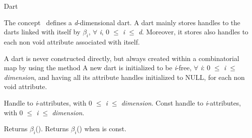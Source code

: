 \ccRefPageBegin
\begin{ccRefConcept}{Dart}

\ccDefinition
  
The concept \ccRefName\ defines a \emph{d}-dimensional dart.  A dart mainly
stores handles to the darts linked with itself by $\beta_i$, $\forall$
\emph{i}, 0 $\leq$ \emph{i} $\leq$ \emph{d}. Moreover, it stores also handles to each
non void attribute associated with itself.


\ccCreation 
{} 
A dart  is never constructed directly, but always created
within a combinatorial map  by using the method
 A new dart is initialized to be \emph{i}-free,
$\forall$ \emph{i}: 0 $\leq$ \emph{i} $\leq$ \emph{dimension}, and having all its attribute
handles initialized to NULL, for each non void attribute.

\ccConstants
{}

\ccTypes
{}
%
\ccGlue
{}

    {Handle to \emph{i}-attributes, with 0 $\leq$ \emph{i} $\leq$ \emph{dimension}.}
\ccGlue
{}
    {Const handle to \emph{i}-attributes, with 0 $\leq$ \emph{i} $\leq$ \emph{dimension}.}

%
         {Returns $\beta_i$().
          }
\ccGlue
{}
         {Returns $\beta_i$() when  is const.
          }


\end{ccRefConcept}
